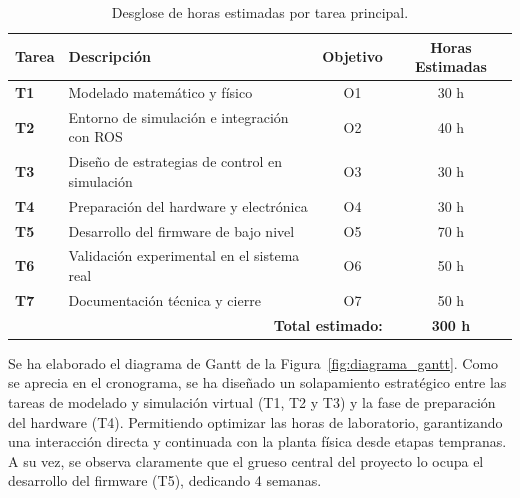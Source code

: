\documentclass[11pt,fleqn]{book} %
\begin{document}
\begin{table}[htbp]
	\centering
	\caption{Desglose de horas estimadas por tarea principal.}
	\label{tab:desglose_horas}
	\small
	\begin{tabular}{llcc}
		\toprule
		\textbf{Tarea} & \textbf{Descripción} & \textbf{Objetivo} & \textbf{Horas Estimadas} \\ \midrule
		\textbf{T1} & Modelado matemático y físico & O1 & 30 h \\
		\textbf{T2} & Entorno de simulación e integración con ROS & O2 & 40 h \\
		\textbf{T3} & Diseño de estrategias de control en simulación & O3 & 30 h \\
		\textbf{T4} & Preparación del hardware y electrónica & O4 & 30 h \\
		\textbf{T5} & Desarrollo del firmware de bajo nivel & O5 & 70 h \\
		\textbf{T6} & Validación experimental en el sistema real & O6 & 50 h \\
		\textbf{T7} & Documentación técnica y cierre & O7 & 50 h \\ \midrule
		\multicolumn{3}{r}{\textbf{Total estimado:}} & \textbf{300 h} \\ \bottomrule
	\end{tabular}
\end{table}

Se ha elaborado el diagrama de Gantt de la Figura~\ref{fig:diagrama_gantt}. Como se aprecia en el cronograma, se ha diseñado un solapamiento estratégico entre las tareas de modelado y simulación virtual (T1, T2 y T3) y la fase de preparación del hardware (T4). Permitiendo optimizar las horas de laboratorio, garantizando una interacción directa y continuada con la planta física desde etapas tempranas. A su vez, se observa claramente que el grueso central del proyecto lo ocupa el desarrollo del firmware (T5), dedicando 4 semanas. 
\end{document}
